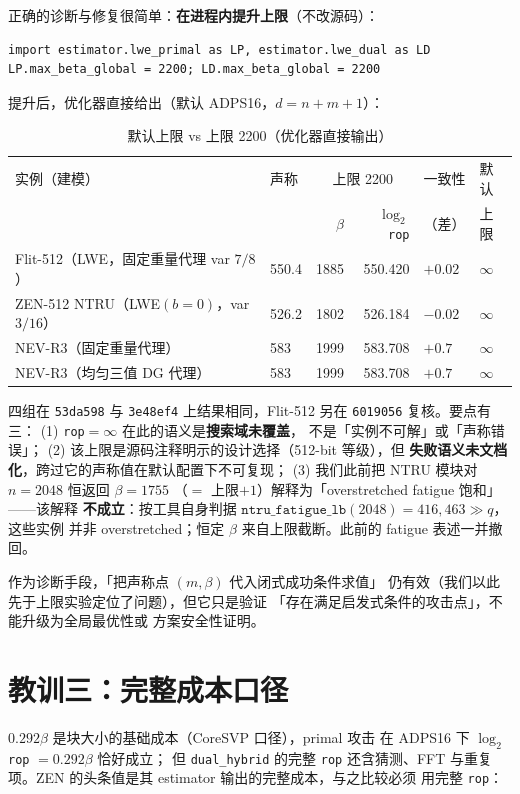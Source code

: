 \documentclass[11pt,a4paper,zihao=-4]{ctexart}
\newcommand{\code}[1]{\texttt{#1}}
\begin{document}
正确的诊断与修复很简单：\textbf{在进程内提升上限}（不改源码）：
\begin{verbatim}
import estimator.lwe_primal as LP, estimator.lwe_dual as LD
LP.max_beta_global = 2200; LD.max_beta_global = 2200
\end{verbatim}
提升后，优化器直接给出（默认 ADPS16，$d{=}n{+}m{+}1$）：

\begin{table}[htbp]\centering\small
\caption{默认上限 vs 上限 2200（优化器直接输出）}\label{tab:cap}
\begin{tabular}{@{}llrrll@{}}
\toprule
实例（建模） & 声称 & \multicolumn{2}{c}{上限 2200} & 一致性 & 默认 \\
 &  & $\beta$ & $\log_2$\code{rop} & （差） & 上限 \\
\midrule
Flit-512（LWE，固定重量代理 var $7/8$） & 550.4 & 1885 & 550.420 & $+0.02$ & $\infty$ \\
ZEN-512 NTRU（LWE$(b{=}0)$，var $3/16$） & 526.2 & 1802 & 526.184 & $-0.02$ & $\infty$ \\
NEV-R3（固定重量代理） & 583 & 1999 & 583.708 & $+0.7$ & $\infty$ \\
NEV-R3（均匀三值 DG 代理） & 583 & 1999 & 583.708 & $+0.7$ & $\infty$ \\
\bottomrule
\end{tabular}
\end{table}

四组在 \code{53da598} 与 \code{3e48ef4} 上结果相同，Flit-512
另在 \code{6019056} 复核。要点有三：
(1) \code{rop}$=\infty$ 在此的语义是\textbf{搜索域未覆盖}，
不是「实例不可解」或「声称错误」；
(2) 该上限是源码注释明示的设计选择（512-bit 等级），但
\textbf{失败语义未文档化}，跨过它的声称值在默认配置下不可复现；
(3) 我们此前把 NTRU 模块对 $n{=}2048$ 恒返回 $\beta{=}1755$
（$=$ 上限$+1$）解释为「overstretched fatigue 饱和」——该解释
\textbf{不成立}：按工具自身判据
$\texttt{ntru\_fatigue\_lb}(2048){=}416{,}463 \gg q$，这些实例
并非 overstretched；恒定 $\beta$ 来自上限截断。此前的 fatigue
表述一并撤回。

作为诊断手段，「把声称点 $(m,\beta)$ 代入闭式成功条件求值」
仍有效（我们以此先于上限实验定位了问题），但它只是验证
「存在满足启发式条件的攻击点」，不能升级为全局最优性或
方案安全性证明。

\section{教训三：完整成本口径}\label{sec:l3}

$0.292\beta$ 是块大小的基础成本（CoreSVP 口径），primal 攻击
在 ADPS16 下 $\log_2$\code{rop} $= 0.292\beta$ 恰好成立；
但 \code{dual\_hybrid} 的完整 \code{rop} 还含猜测、FFT 与重复
项。ZEN 的头条值是其 estimator 输出的完整成本，与之比较必须
用完整 \code{rop}：
\end{document}
